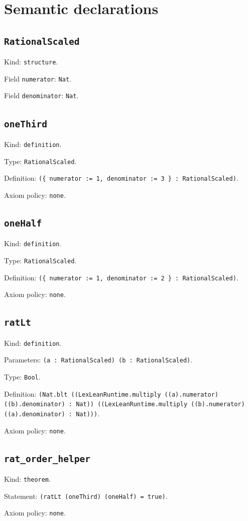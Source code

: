 \documentclass[11pt]{article}
\begin{document}
\section*{Semantic declarations}
\subsection*{\texttt{RationalScaled}}
\noindent Kind: \texttt{structure}.\par
\noindent Field \texttt{numerator}: \texttt{Nat}.\par
\noindent Field \texttt{denominator}: \texttt{Nat}.\par
\subsection*{\texttt{oneThird}}
\noindent Kind: \texttt{definition}.\par
\noindent Type: \texttt{RationalScaled}.\par
\noindent Definition: \texttt{(\{ numerator := 1, denominator := 3 \} : RationalScaled)}.\par
\noindent Axiom policy: \texttt{none}.\par
\subsection*{\texttt{oneHalf}}
\noindent Kind: \texttt{definition}.\par
\noindent Type: \texttt{RationalScaled}.\par
\noindent Definition: \texttt{(\{ numerator := 1, denominator := 2 \} : RationalScaled)}.\par
\noindent Axiom policy: \texttt{none}.\par
\subsection*{\texttt{ratLt}}
\noindent Kind: \texttt{definition}.\par
\noindent Parameters: \texttt{(a : RationalScaled) (b : RationalScaled)}.\par
\noindent Type: \texttt{Bool}.\par
\noindent Definition: \texttt{(Nat.blt ((LexLeanRuntime.multiply ((a).numerator) ((b).denominator) : Nat)) ((LexLeanRuntime.multiply ((b).numerator) ((a).denominator) : Nat)))}.\par
\noindent Axiom policy: \texttt{none}.\par
\subsection*{\texttt{rat\_order\_helper}}
\noindent Kind: \texttt{theorem}.\par
\noindent Statement: \texttt{(ratLt (oneThird) (oneHalf) = true)}.\par
\noindent Axiom policy: \texttt{none}.\par
\end{document}
